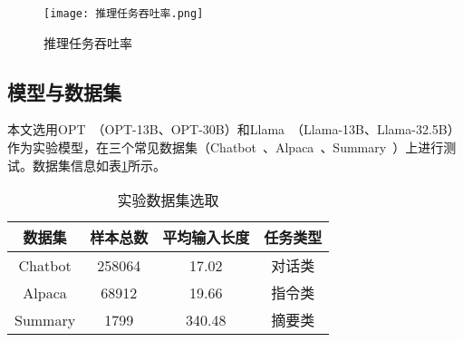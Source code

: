 
\begin{figure*}[!htbp]
  \centering
  \texttt{[image: 推理任务吞吐率.png]}
  \caption{推理任务吞吐率}
  \label{Fig:推理任务吞吐率}
\end{figure*}

\subsection{模型与数据集}

本文选用OPT~\cite{OPT}（OPT-13B、OPT-30B）和Llama~\cite{Llama}（Llama-13B、Llama-32.5B）作为实验模型，在三个常见数据集（Chatbot~\cite{Chatbot}、Alpaca~\cite{Alpaca}、Summary~\cite{Summary}）上进行测试。数据集信息如表\ref{Table:实验数据集选取}所示。

\begin{table}[H]
  \centering
  \caption{实验数据集选取}
  \label{Table:实验数据集选取}
  \renewcommand{\arraystretch}{1.25}
  \small
  \begin{tabular}{c c c c}
    \toprule
    \textbf{数据集} & \textbf{样本总数} & \textbf{平均输入长度} & \textbf{任务类型} \\
    \midrule
    Chatbot & 258064 & 17.02 & 对话类 \\
    Alpaca & 68912 & 19.66 & 指令类 \\
    Summary & 1799 & 340.48 & 摘要类 \\
    \bottomrule
  \end{tabular}
\end{table}


